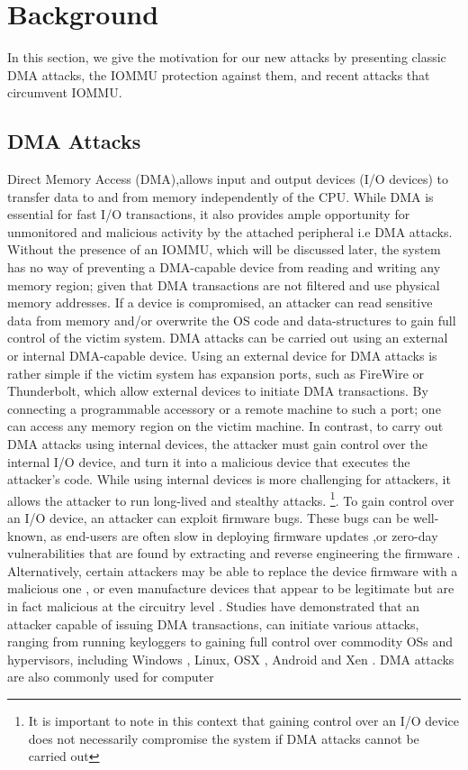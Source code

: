\section{Background}
In this section, we give the motivation for our new attacks by presenting classic DMA attacks, the IOMMU protection against them, and recent attacks that circumvent IOMMU.
\subsection{DMA Attacks}
Direct Memory Access (DMA),allows input and output devices (I/O devices) to transfer data to and from memory \cite{oC54} independently of the CPU. While DMA is essential for fast I/O transactions, it also provides ample opportunity for unmonitored and malicious activity by the attached peripheral i.e DMA attacks. Without the presence of an IOMMU, which will be discussed later, the system has no way of preventing a DMA-capable device from reading and writing any memory region; given that DMA transactions are not filtered and use physical memory addresses. If a device is compromised, an attacker can read sensitive data from memory and/or overwrite the OS code and data-structures to gain full control of the victim system. DMA attacks can be carried out using an external or internal DMA-capable device. Using an external device for DMA attacks is rather simple if the victim system has expansion ports, such as FireWire or Thunderbolt, which allow external devices to initiate DMA transactions. By connecting a programmable accessory or a remote machine to such a port; one can access  any memory region on the victim machine\cite{Dor04, Vol, MM, thunder}. In contrast, to carry out DMA attacks using internal devices, the attacker must gain control over the internal I/O device, and turn it into a malicious device that executes the attacker’s code. While using internal devices is more challenging for attackers, it allows the attacker to run long-lived and stealthy attacks. \footnote{It is important to note in this context that gaining control over an I/O device does not necessarily compromise the system if DMA attacks cannot be carried out}. To gain control over an I/O device, an attacker can exploit firmware bugs. These bugs can be well-known, as end-users are often slow in deploying firmware updates \cite{DPVL10},or zero-day vulnerabilities that are found by extracting and reverse engineering the firmware \cite{Ben17b}. Alternatively, certain attackers may be able to replace the device firmware with a malicious one \cite{ZKB13, NL14}, or even manufacture devices that appear to be legitimate but are in fact malicious at the circuitry level \cite{YHD16, thunder}. Studies have demonstrated that an attacker capable of issuing DMA transactions, can initiate various attacks, ranging from running keyloggers \cite{LKV13, SB12} to gaining full control over commodity OSs and hypervisors, including Windows \cite{AD10,thunder}, Linux, OSX \cite{Fri16, thunder}, Android \cite{Ben17b} and Xen \cite{Woj08}. DMA attacks are also commonly used for computer 